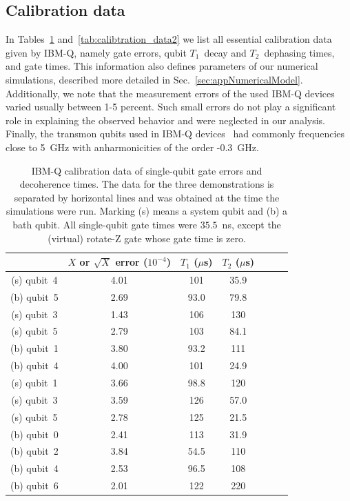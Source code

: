 \documentclass[twocolumn,amsmath,amssymb,pra]{revtex4-2}
\begin{document}
\subsection{Calibration data}
In Tables~\ref{tab:calibtration_data1} and~\ref{tab:calibtration_data2}
we list all essential calibration data given by IBM-Q, namely
gate errors, qubit $T_1$~decay and $T_2$~dephasing times, and gate times.
This information also defines parameters of our numerical simulations, described more detailed in Sec.~\ref{sec:appNumericalModel}.
Additionally, we note that
the measurement errors of the used IBM-Q devices varied usually between 1-5 percent.
Such small errors do not play a significant role in explaining the observed behavior and were neglected in our analysis.
Finally, the transmon qubits used in IBM-Q devices~\cite{Sheldon_2016} had commonly frequencies close to 5~GHz with anharmonicities of the order -0.3~GHz.
\begin{table}[ht]
\begin{tabular}{c|c|c|c|c|c|c}
            & $X$ or $\sqrt{X}$ error ($10^{-4}$)   & $T_{1}$ ($\mu$s)   & $T_{2}$ ($\mu$s)    \\
\hline
(s) qubit~4 & 4.01   & 101    & 35.9       \\
(b) qubit~5 & 2.69   & 93.0   & 79.8       \\
\hline
(s) qubit~3 & 1.43   & 106    & 130        \\
(s) qubit~5 & 2.79   & 103    & 84.1       \\
(b) qubit~1 & 3.80   & 93.2   & 111        \\
(b) qubit~4 & 4.00   & 101    & 24.9       \\
\hline
(s) qubit~1 & 3.66   & 98.8   & 120        \\
(s) qubit~3 & 3.59   & 126    & 57.0       \\
(s) qubit~5 & 2.78   & 125    & 21.5       \\
(b) qubit~0 & 2.41   & 113    & 31.9       \\
(b) qubit~2 & 3.84   & 54.5   & 110        \\
(b) qubit~4 & 2.53   & 96.5   & 108        \\
(b) qubit~6 & 2.01   & 122    & 220        \\
\hline
\end{tabular}
\centering
\caption{
IBM-Q calibration data of single-qubit gate errors and decoherence times.
The data for the three demonstrations is separated by horizontal lines and was obtained at the time the simulations were run.
Marking (s) means a system qubit and (b) a bath qubit.
All single-qubit gate times were $35.5$~ns, except the (virtual) rotate-Z gate whose gate time is zero.
}
\label{tab:calibtration_data1}
\end{table}
\end{document}
